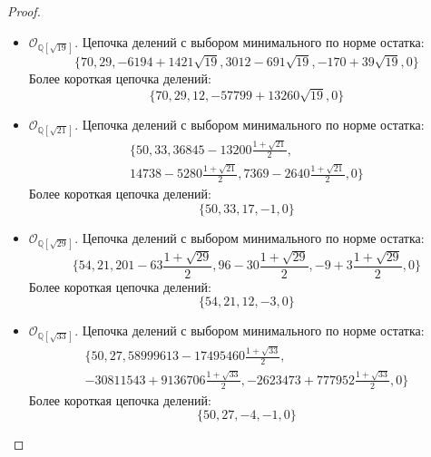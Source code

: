 \documentclass[_00_dissertation.tex]{subfiles}
\begin{document}
\begin{proof}
\begin{itemize}
        \item $\mathcal{O}_{\mathbb{Q}[\sqrt{19}]}$.
        Цепочка делений с выбором минимального по норме остатка:
        \begin{equation*}
            \{70, 29, -6194+1421\sqrt{19}, 3012-691\sqrt{19}, -170+39\sqrt{19}, 0\}
        \end{equation*}
        Более короткая цепочка делений:
        \begin{equation*}
            \{70, 29, 12, -57799+13260\sqrt{19}, 0\}
        \end{equation*}

        \item $\mathcal{O}_{\mathbb{Q}[\sqrt{21}]}$.
        Цепочка делений с выбором минимального по норме остатка:
        \begin{multline*}
          \{50, 33, 36845-13200\frac{1+\sqrt{21}}{2},\\
          14738-5280\frac{1+\sqrt{21}}{2}, 7369-2640\frac{1+\sqrt{21}}{2}, 0\}
        \end{multline*}
        Более короткая цепочка делений:
        \begin{equation*}
            \{50, 33, 17, -1, 0\}
        \end{equation*}

        \item $\mathcal{O}_{\mathbb{Q}[\sqrt{29}]}$.
        Цепочка делений с выбором минимального по норме остатка:
        \begin{equation*}
            \{54, 21, 201-63\frac{1+\sqrt{29}}{2}, 96-30\frac{1+\sqrt{29}}{2}, -9+3\frac{1+\sqrt{29}}{2}, 0\}
        \end{equation*}
        Более короткая цепочка делений:
        \begin{equation*}
            \{54, 21, 12, -3, 0\}
        \end{equation*}

        \item $\mathcal{O}_{\mathbb{Q}[\sqrt{33}]}$.
        Цепочка делений с выбором минимального по норме остатка:
        \begin{multline*}
            \{50, 27, 58999613-17495460\frac{1+\sqrt{33}}{2},\\
            -30811543+9136706\frac{1+\sqrt{33}}{2}, -2623473+777952\frac{1+\sqrt{33}}{2}, 0\}
        \end{multline*}
        Более короткая цепочка делений:
        \begin{equation*}
            \{50, 27, -4, -1, 0\}
        \end{equation*}


\end{itemize}
\end{proof}
\end{document}
